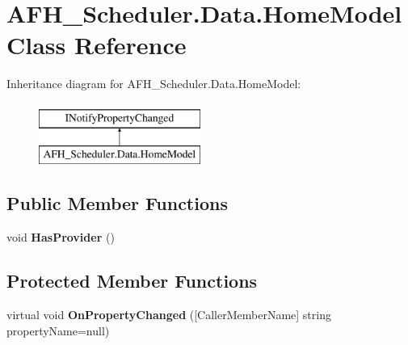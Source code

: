 \section{A\+F\+H\+\_\+\+Scheduler.\+Data.\+Home\+Model Class Reference}
\label{class_a_f_h___scheduler_1_1_data_1_1_home_model}
Inheritance diagram for A\+F\+H\+\_\+\+Scheduler.\+Data.\+Home\+Model\+:\begin{figure}[H]
\begin{center}
\leavevmode
\includegraphics[height=2.000000cm]{class_a_f_h___scheduler_1_1_data_1_1_home_model}
\end{center}
\end{figure}
\subsection*{Public Member Functions}
\begin{DoxyCompactItemize}
\item 
\mbox{\label{class_a_f_h___scheduler_1_1_data_1_1_home_model_a8f20c70c8fe1186f36548349b65ee998}} 
void {\bfseries Has\+Provider} ()
\end{DoxyCompactItemize}
\subsection*{Protected Member Functions}
\begin{DoxyCompactItemize}
\item 
\mbox{\label{class_a_f_h___scheduler_1_1_data_1_1_home_model_ad47002cb42524b3777cc9acb5d03e822}} 
virtual void {\bfseries On\+Property\+Changed} ([Caller\+Member\+Name] string property\+Name=null)
\end{DoxyCompactItemize}
